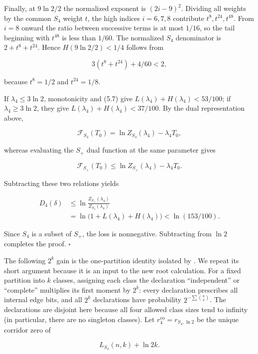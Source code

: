 \documentclass[11pt,reqno]{amsart}
\begin{document}
Finally, at \(9\ln 2/2\) the normalized exponent is
\((2i-9)^2\). Dividing all weights by the common \(S_4\) weight \(t\),
the high indices \(i=6,7,8\) contribute \(t^8,t^{24},t^{48}\).
From \(i=8\) onward the ratio between successive terms is at most
\(1/16\), so the tail beginning with \(t^{48}\) is less than \(1/60\).
The normalized \(S_4\) denominator is \(2+t^8+t^{24}\). Hence
\(H(9\ln 2/2)<1/4\) follows from

\[
 3(t^8+t^{24})+4/60<2,                                  \tag{5.8}
\]

because \(t^8=1/2\) and \(t^{24}=1/8\).

If \(\lambda_4\le 3{\ln 2}\), monotonicity and (5.7) give
\(L(\lambda_4)+H(\lambda_4)<53/100\); if
\(\lambda_4\ge 3{\ln 2}\), they give
\(L(\lambda_4)+H(\lambda_4)<37/100\).
By the dual representation above,

\[
 \mathcal F_{S_4}(T_0)
 =\ln Z_{S_4}(\lambda_4)-\lambda_4T_0,
\]

whereas evaluating the \(S_+\) dual function at the same parameter gives

\[
 \mathcal F_{S_+}(T_0)
 \le \ln Z_{S_+}(\lambda_4)-\lambda_4T_0.
\]

Subtracting these two relations yields

\[
 \begin{aligned}
 D_4(\delta)
 &\le \ln\frac{Z_{S_+}(\lambda_4)}{Z_{S_4}(\lambda_4)}\\
 &=\ln\!\bigl(1+L(\lambda_4)+H(\lambda_4)\bigr)
 <\ln(153/100).
 \end{aligned}
\]

Since \(S_4\) is a subset of \(S_+\), the loss is
nonnegative. Subtracting from \(\ln 2\) completes the proof.
\(\square\)

The following \(2^k\) gain is the one-partition identity isolated by
\citet[Proposition~6]{heckel-2025-difference}.  We repeat its short
argument because it is an input to the new root calculation.  For a fixed
partition into \(k\) classes, assigning each class the declaration
``independent'' or ``complete'' multiplies its first moment by \(2^k\):
every declaration prescribes all internal edge bits, and all \(2^k\)
declarations have probability \(2^{-\sum \binom{u}{2}}\).  The declarations
are disjoint here because all four allowed class sizes tend to infinity
(in particular, there are no singleton classes).
Let
\(r_4^{\mathrm{co}}=r_{S_4,{\ln 2}}\)
be the unique corridor zero of

\[
 L_{S_4}(n,k)+{\ln 2}k.                                       \tag{5.9}
\]
\end{document}

